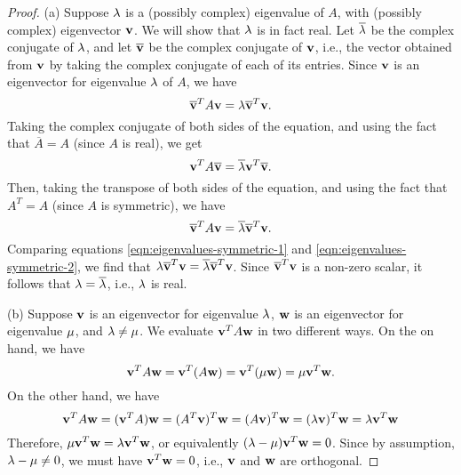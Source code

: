 \begin{proof}
  (a) Suppose $\lambda$ is a (possibly complex) eigenvalue of $A$,
  with (possibly complex) eigenvector $\vect{v}$. We will show that
  $\lambda$ is in fact real. Let $\overline{\lambda}$ be the
  complex conjugate of $\lambda$, and let $\overline{\vect{v}}$ be
  the complex conjugate of $\vect{v}$, i.e., the vector obtained from
  $\vect{v}$ by taking the complex conjugate of each of its entries.
  Since $\vect{v}$ is an eigenvector for eigenvalue $\lambda$ of
  $A$, we have
  \begin{equation}\label{eqn:eigenvalues-symmetric-1}
    \overline{\vect{v}}^T A\vect{v}
    = \eigenvar \overline{\vect{v}}^T\vect{v}.
  \end{equation}
  Taking the complex conjugate of both sides of the equation, and
  using the fact that $\overline{A}=A$ (since $A$ is
  real), we get
  \begin{equation}
    \vect{v}^T A\overline{\vect{v}}
    = \overline{\eigenvar} \vect{v}^T\overline{\vect{v}}.
  \end{equation}
  Then, taking the transpose of both sides of the equation, and using
  the fact that $A^T=A$ (since $A$ is symmetric), we have
  \begin{equation}\label{eqn:eigenvalues-symmetric-2}
    \overline{\vect{v}}^T A\vect{v}
    = \overline{\eigenvar} \overline{\vect{v}}^T\vect{v}.
  \end{equation}
  Comparing equations {\eqref{eqn:eigenvalues-symmetric-1}} and
  {\eqref{eqn:eigenvalues-symmetric-2}}, we find that
  $\eigenvar \overline{\vect{v}}^T\vect{v} = \overline{\eigenvar}
  \overline{\vect{v}}^T\vect{v}$. Since
  $\overline{\vect{v}}^T\vect{v}$ is a non-zero scalar, it follows
  that $\lambda = \overline{\lambda}$, i.e., $\lambda$ is real.

  \noindent
  (b) Suppose $\vect{v}$ is an eigenvector for eigenvalue
  $\lambda$, $\vect{w}$ is an eigenvector for eigenvalue
  $\mu$, and $\lambda\neq\mu$.  We evaluate
  $\vect{v}^TA\vect{w}$ in two different ways. On the on hand, we have
  \begin{equation*}
    \vect{v}^TA\vect{w}
    = \vect{v}^T(A\vect{w})
    = \vect{v}^T(\eigenvarB\vect{w})
    = \eigenvarB \vect{v}^T\vect{w}.
  \end{equation*}
  On the other hand, we have
  \begin{equation*}
    \vect{v}^TA\vect{w}
    = (\vect{v}^TA)\vect{w}
    = (A^T\vect{v})^T\vect{w}
    = (A\vect{v})^T\vect{w}
    = (\eigenvarA\vect{v})^T\vect{w}
    = \eigenvarA\vect{v}^T\vect{w}
  \end{equation*}
  Therefore,
  $\eigenvarB\vect{v}^T\vect{w} = \eigenvarA\vect{v}^T\vect{w}$, or
  equivalently $(\eigenvarA - \eigenvarB)\vect{v}^T\vect{w} =
  0$. Since by assumption, $\lambda - \mu\neq 0$, we must
  have $\vect{v}^T\vect{w} = 0$, i.e., $\vect{v}$ and $\vect{w}$ are
  orthogonal.
\end{proof}

